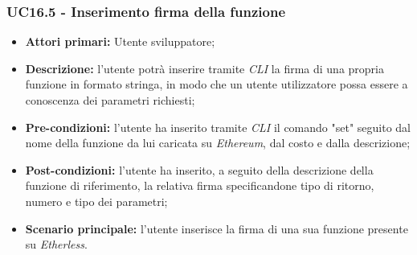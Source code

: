 \subsubsection{UC16.5 - Inserimento firma della funzione}
\begin{itemize}
	\item \textbf{Attori primari:} Utente sviluppatore;
	\item \textbf{Descrizione:} l'utente potrà inserire tramite \textit{CLI\glo} la firma di una propria funzione in formato stringa, in modo che un utente utilizzatore possa essere a conoscenza dei parametri richiesti;
	\item \textbf{Pre-condizioni:} l'utente ha inserito tramite \textit{CLI\glo} il comando "set" seguito dal nome della funzione da lui caricata su \textit{Ethereum\glos}, dal costo e dalla descrizione;
	\item \textbf{Post-condizioni:} l'utente ha inserito, a seguito della descrizione della funzione di riferimento, la relativa firma specificandone tipo di ritorno, numero e tipo dei parametri;
	\item \textbf{Scenario principale:} l'utente inserisce la firma di una sua funzione presente su \textit{Etherless}.
\end{itemize}
